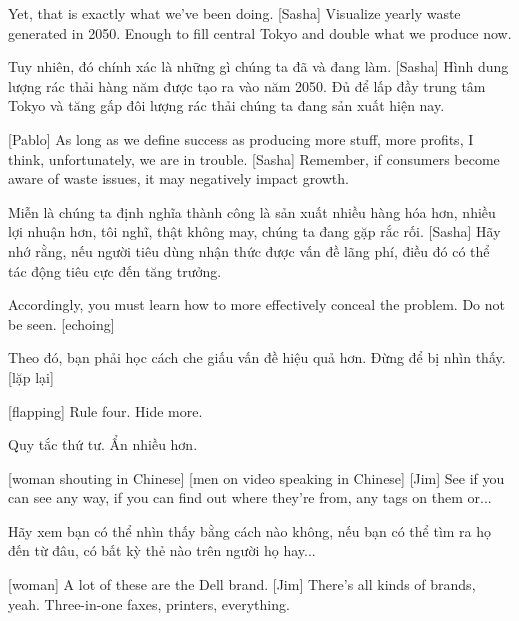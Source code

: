 \documentclass[a4paper]{article}
\begin{document}
	Yet, that is exactly what we've been doing.
	[Sasha] Visualize yearly waste generated in 2050.
	Enough to fill central Tokyo and double what we produce now.
	
	\begin{vietnamese-v2}
		Tuy nhiên, đó chính xác là những gì chúng ta đã và đang làm.
		[Sasha] Hình dung lượng rác thải hàng năm được tạo ra vào năm 2050.
		Đủ để lấp đầy trung tâm Tokyo và tăng gấp đôi lượng rác thải chúng ta đang sản xuất hiện nay.
	\end{vietnamese-v2}
	
	[Pablo] As long as we define success as producing more stuff, more profits, I think, unfortunately, we are in trouble.
	[Sasha] Remember, if consumers become aware of waste issues, it may negatively impact growth.
	
	\begin{vietnamese-v2}
		[Pablo] Miễn là chúng ta định nghĩa thành công là sản xuất nhiều hàng hóa hơn, nhiều lợi nhuận hơn, tôi nghĩ, thật không may, chúng ta đang gặp rắc rối.
		[Sasha] Hãy nhớ rằng, nếu người tiêu dùng nhận thức được vấn đề lãng phí, điều đó có thể tác động tiêu cực đến tăng trưởng.
	\end{vietnamese-v2}
	
	Accordingly, you must learn how to more effectively conceal the problem.
	Do not be seen. [echoing]
	
	\begin{vietnamese-v2}
		Theo đó, bạn phải học cách che giấu vấn đề hiệu quả hơn.
		Đừng để bị nhìn thấy. [lặp lại]
	\end{vietnamese-v2}
	
	[flapping]
	Rule four. Hide more.
	
	\begin{vietnamese-v2}
		[vỗ tay]
		Quy tắc thứ tư. Ẩn nhiều hơn.
	\end{vietnamese-v2}
	
	[woman shouting in Chinese]
	[men on video speaking in Chinese]
	[Jim] See if you can see any way, if you can find out where they're from, any tags on them or...
	
	\begin{vietnamese-v2}
		 Hãy xem bạn có thể nhìn thấy bằng cách nào không, nếu bạn có thể tìm ra họ đến từ đâu, có bất kỳ thẻ nào trên người họ hay...
	\end{vietnamese-v2}
	
	[woman] A lot of these are the Dell brand.
	[Jim] There's all kinds of brands, yeah.
	Three-in-one faxes, printers, everything.
	
\end{document}
